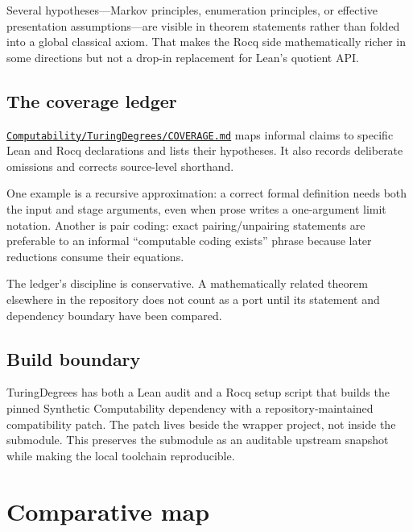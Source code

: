\documentclass[
  10pt,
  a4paper,
  twoside,
  open=any,
  parskip=half,
  headings=big
]{scrreprt}
\newcommand{\CommitFull}{675d0a2ff0fc624fba199e006049016ba806f40a}
\newcommand{\RepoBlobBase}{https://github.com/VladimirReshetnikov/ProveIt/blob/\CommitFull/}
\newcommand{\RepoFile}[1]{%
  \href{\RepoBlobBase\detokenize{#1}}{\nolinkurl{#1}}}
\begin{document}
Several hypotheses---Markov principles, enumeration principles, or effective
presentation assumptions---are visible in theorem statements rather than
folded into a global classical axiom.  That makes the Rocq side mathematically
richer in some directions but not a drop-in replacement for Lean's quotient
API.

\subsection{The coverage ledger}

\RepoFile{Computability/TuringDegrees/COVERAGE.md} maps informal claims to
specific Lean and Rocq declarations and lists their hypotheses.  It also
records deliberate omissions and corrects source-level shorthand.

One example is a recursive approximation: a correct formal definition needs
both the input and stage arguments, even when prose writes a one-argument
limit notation.  Another is pair coding: exact pairing/unpairing statements
are preferable to an informal ``computable coding exists'' phrase because
later reductions consume their equations.

The ledger's discipline is conservative.  A mathematically related theorem
elsewhere in the repository does not count as a port until its statement and
dependency boundary have been compared.

\subsection{Build boundary}

TuringDegrees has both a Lean audit and a Rocq setup script that builds the
pinned Synthetic Computability dependency with a repository-maintained
compatibility patch.  The patch lives beside the wrapper project, not inside
the submodule.  This preserves the submodule as an auditable upstream snapshot
while making the local toolchain reproducible.

\section{Comparative map}
\end{document}
